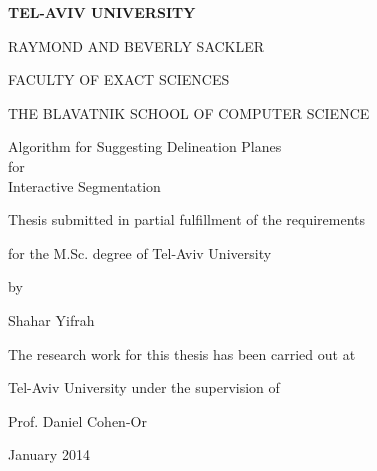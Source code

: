 %
%

\def\titlespace{\vspace{7mm}}

\begin{center}
\thispagestyle{empty}


\large\textbf{TEL-AVIV UNIVERSITY}

\large{RAYMOND AND BEVERLY SACKLER}

\large{FACULTY OF EXACT SCIENCES}

\large{THE BLAVATNIK SCHOOL OF COMPUTER SCIENCE}

\titlespace

\titlespace

\Huge{Algorithm for Suggesting Delineation Planes}\\
\linespread{1.3} \LARGE{for}\\
\linespread{1.1}\Huge{Interactive Segmentation}\linespread{1.4}

\titlespace

\titlespace

\titlespace

\large{Thesis submitted in partial fulfillment of the
requirements}

\large{for the M.Sc. degree of Tel-Aviv University}

\large{by}

\large{Shahar Yifrah}

\titlespace

\titlespace

\large{The research work for this thesis has been carried out at}

\large{Tel-Aviv University under the supervision of}

\titlespace

\large{Prof. Daniel Cohen-Or}

\titlespace


%



\titlespace

\large{January 2014}

\end{center}

\cleardoublepage
